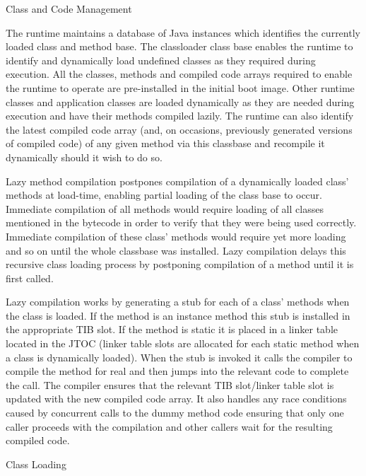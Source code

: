 \begin{section}{Class and Code Management}
\label{sec:classandcodemanagement}

The runtime maintains a database of Java instances which identifies the currently loaded class and method base. The classloader class base enables the runtime to identify and dynamically load undefined classes as they required during execution. All the classes, methods and compiled code arrays required to enable the runtime to operate are pre-installed in the initial boot image. Other runtime classes and application classes are loaded dynamically as they are needed during execution and have their methods compiled lazily. The runtime can also identify the latest compiled code array (and, on occasions, previously generated versions of compiled code) of any given method via this classbase and recompile it dynamically should it wish to do so.

Lazy method compilation postpones compilation of a dynamically loaded class' methods at load-time, enabling partial loading of the class base to occur. Immediate compilation of all methods would require loading of all classes mentioned in the bytecode in order to verify that they were being used correctly. Immediate compilation of these class' methods would require yet more loading and so on until the whole classbase was installed. Lazy compilation delays this recursive class loading process by postponing compilation of a method until it is first called.

Lazy compilation works by generating a stub for each of a class' methods when the class is loaded. If the method is an instance method this stub is installed in the appropriate TIB slot. If the method is static it is placed in a linker table located in the JTOC (linker table slots are allocated for each static method when a class is dynamically loaded). When the stub is invoked it calls the compiler to compile the method for real and then jumps into the relevant code to complete the call. The compiler ensures that the relevant TIB slot/linker table slot is updated with the new compiled code array. It also handles any race conditions caused by concurrent calls to the dummy method code ensuring that only one caller proceeds with the compilation and other callers wait for the resulting compiled code.

\begin{subsection}{Class Loading}


\end{subsection}
\end{section}
